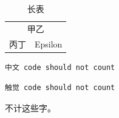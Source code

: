 \begin{longtable}{cc}
\caption{长表} \\
\multicolumn{2}{c}{甲乙} \\
\multirow{2}{*}{丙丁} & Epsilon \\
\end{longtable}
\begin{verbatim}
中文 code should not count
\end{verbatim}
\begin{verbatim}
触觉 code should not count
\end{verbatim}
不计这些字。
